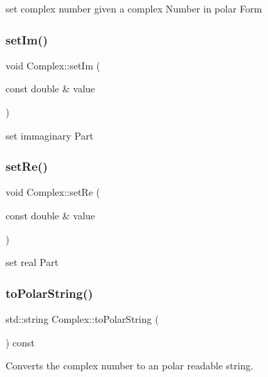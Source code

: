 set complex number given a complex Number in polar Form 

\mbox{\label{class_complex_ac63d8b924962371c0b2c448661d4ae84}} 
\subsubsection{\texorpdfstring{set\+Im()}{setIm()}}
{\footnotesize\ttfamily void Complex\+::set\+Im (\begin{DoxyParamCaption}\item[{const double \&}]{value }\end{DoxyParamCaption})}



set immaginary Part 

\mbox{\label{class_complex_ab0c48d63855dd6f61c750450e8a7efa8}} 
\subsubsection{\texorpdfstring{set\+Re()}{setRe()}}
{\footnotesize\ttfamily void Complex\+::set\+Re (\begin{DoxyParamCaption}\item[{const double \&}]{value }\end{DoxyParamCaption})}



set real Part 

\mbox{\label{class_complex_acbec47c6e4b7538c6f1a1b4234f9cbf7}} 
\subsubsection{\texorpdfstring{to\+Polar\+String()}{toPolarString()}}
{\footnotesize\ttfamily std\+::string Complex\+::to\+Polar\+String (\begin{DoxyParamCaption}{ }\end{DoxyParamCaption}) const}



Converts the complex number to an polar readable string. 

